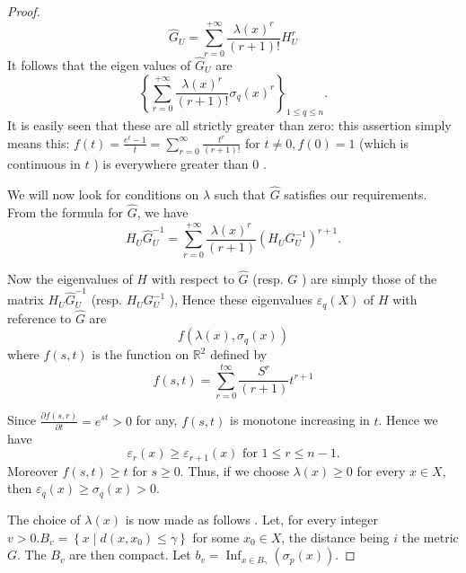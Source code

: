 \documentclass[lang=en,12pt]{beautybook}
\begin{document}
\begin{proof}
    \begin{equation*}
    \widehat{G}_U=\sum_{r=0}^{+\infty} \frac{\lambda(x)^r}{(r+1) !} H_U^r
    \end{equation*}
    It follows that the eigen values of $\widehat{G}_U$ are
    \begin{equation*}
    \left\{\sum_{r=0}^{+\infty} \frac{\lambda(x)^r}{(r+1) !} \sigma_q(x)^r\right\}_{1 \leq q \leq n} .
    \end{equation*}
    It is easily seen that these are all strictly greater than zero: this assertion simply means this: $f(t)=\frac{e^t-1}{t}=\sum_{r=0}^{\infty} \frac{t^r}{(r+1) !}$ for $t \neq 0, f(0)=1$ (which is continuous in $t$ ) is everywhere greater than $0$ .

    We will now look for conditions on $\lambda$ such that $\widehat{G}$ satisfies our requirements. From the formula for $\widehat{G}$, we have
    \begin{equation*}
    H_U \widehat{G}_U^{-1}=\sum_{r=0}^{+\infty} \frac{\lambda(x)^r}{(r+1)}\left(H_U G_U^{-1}\right)^{r+1} .
    \end{equation*}

    Now the eigenvalues of $H$ with respect to $\widehat{G}$ (resp. $G$ ) are simply those of the matrix $H_U \widehat{G}_U^{-1}$ (resp. $H_U G_U^{-1}$ ), Hence these eigenvalues $\varepsilon_q(X)$ of $H$ with reference to $\widehat{G}$ are
    \begin{equation*}
    f\left(\lambda(x), \sigma_q(x)\right)
    \end{equation*}
    where $f(s, t)$ is the function on $\mathbb{R}^2$ defined by
    \begin{equation*}
    f(s, t)=\sum_{r=0}^{t \infty} \frac{S^r}{(r+1)} t^{r+1}
    \end{equation*}

    Since $\frac{\partial f(s, r)}{\partial t}=e^{s t}>0$ for any, $f(s, t)$ is monotone increasing in $t$. Hence we have
    \begin{equation*}
    \varepsilon_r(x) \geqslant \varepsilon_{r+1}(x) \text { for } 1 \leqslant r \leqslant n-1 .
    \end{equation*}
    Moreover $f(s, t) \geqslant t$ for $s \geqslant 0$. Thus, if we choose $\lambda(x) \geqslant 0$ for every $x \in X$, then $\varepsilon_q(x) \geqslant \sigma_q(x)>0$.

The choice of $\lambda(x)$ is now made as follows . Let, for every integer $v>0 . B_v=\left\{x \mid d\left(x, x_0\right) \leqslant \gamma\right\}$ for some $x_0 \in X$, the distance being $i$ the metric $G$. The $B_v$ are then compact. Let $b_v=\operatorname{Inf}_{x \in B_\gamma}\left(\sigma_p(x)\right)$.


\end{proof}
\end{document}
